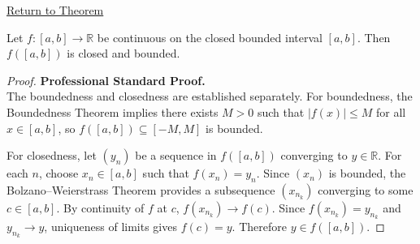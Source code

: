 \newpage
{}
\label{prf:image-of-function-on-closed-bounded-interval-is-closed-bounded}

\begin{remark*}[Return]
\hyperref[thm:image-of-function-on-closed-bounded-interval-is-closed-bounded]{Return to Theorem}
\end{remark*}

\begin{theorem*}
Let $f \colon [a,b] \to \mathbb{R}$ be continuous on the closed bounded interval $[a,b]$. Then $f([a,b])$ is closed and bounded.
\end{theorem*}

\begin{proof}
\textbf{Professional Standard Proof.}~\\
The boundedness and closedness are established separately. For boundedness, the Boundedness Theorem implies there exists $M > 0$ such that $|f(x)| \leq M$ for all $x \in [a,b]$, so $f([a,b]) \subseteq [-M, M]$ is bounded.

For closedness, let $(y_n)$ be a sequence in $f([a,b])$ converging to $y \in \mathbb{R}$. For each $n$, choose $x_n \in [a,b]$ such that $f(x_n) = y_n$. Since $(x_n)$ is bounded, the Bolzano--Weierstrass Theorem provides a subsequence $(x_{n_k})$ converging to some $c \in [a,b]$. By continuity of $f$ at $c$, $f(x_{n_k}) \to f(c)$. Since $f(x_{n_k}) = y_{n_k}$ and $y_{n_k} \to y$, uniqueness of limits gives $f(c) = y$. Therefore $y \in f([a,b])$.
\end{proof}

